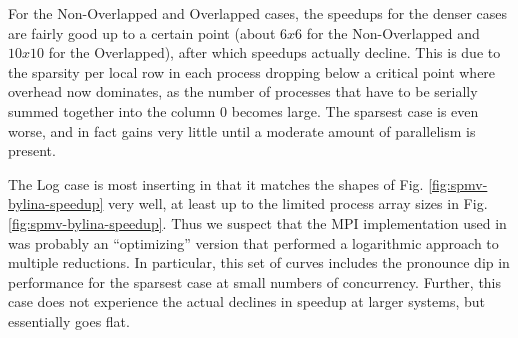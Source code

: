 For the Non-Overlapped and Overlapped cases, the speedups for the denser cases are fairly good up to a certain point (about $6x6$ for the Non-Overlapped and $10x10$ for the Overlapped), after which speedups actually decline. This is due to the sparsity per local row in each process dropping below a critical point where overhead now dominates, as the number of processes that have to be serially summed together into the column 0 becomes large. The sparsest case is even worse, and in fact gains very little until a moderate amount of parallelism is present.

The Log case is most inserting in that it matches the shapes of Fig. \ref{fig:spmv-bylina-speedup} very well, at least up to the limited process array sizes in Fig. \ref{fig:spmv-bylina-speedup}.  Thus we suspect that the MPI implementation used in \cite{techbib:6933066} was probably an ``optimizing'' version that performed a logarithmic approach to multiple reductions. In particular, this set of curves includes the pronounce dip in performance for the sparsest case at small numbers of concurrency. Further, this case does not experience the actual declines in speedup at larger systems, but essentially goes flat.

